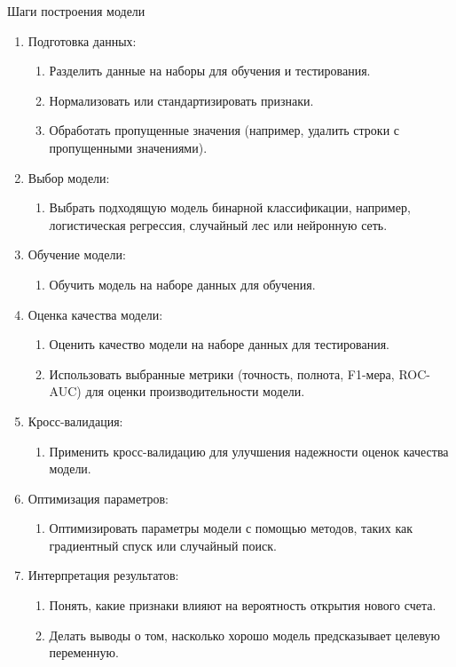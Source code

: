 Шаги построения модели
\begin{enumerate}
\item Подготовка данных:
	\begin{enumerate}
	\item Разделить данные на наборы для обучения и тестирования.
	\item Нормализовать или стандартизировать признаки.
	\item Обработать пропущенные значения (например, удалить строки с пропущенными значениями).
	\end{enumerate}
\item Выбор модели:
	\begin{enumerate}
	\item Выбрать подходящую модель бинарной классификации, например, логистическая регрессия, случайный лес или нейронную сеть.
	\end{enumerate}
\item Обучение модели:
	\begin{enumerate}
	\item Обучить модель на наборе данных для обучения.
	\end{enumerate}
\item Оценка качества модели:
	\begin{enumerate}
	\item Оценить качество модели на наборе данных для тестирования.
	\item Использовать выбранные метрики (точность, полнота, F1-мера, ROC-AUC) для оценки производительности модели.
	\end{enumerate}
\item Кросс-валидация:
	\begin{enumerate}
	\item Применить кросс-валидацию для улучшения надежности оценок качества модели.
	\end{enumerate}
\item Оптимизация параметров:
	\begin{enumerate}
	\item Оптимизировать параметры модели с помощью методов, таких как градиентный спуск или случайный поиск.
	\end{enumerate}
\item Интерпретация результатов:
	\begin{enumerate}
	\item Понять, какие признаки влияют на вероятность открытия нового счета.
	\item Делать выводы о том, насколько хорошо модель предсказывает целевую переменную.
	\end{enumerate}
\end{enumerate}

